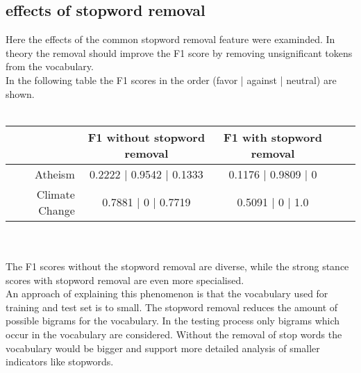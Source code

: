 \documentclass[a4paper,12pt,twoside]{article}
\begin{document}
\subsection{effects of stopword removal}
Here the effects of the common stopword removal feature were examinded. In theory the removal should improve the F1 score by removing unsignificant tokens from the vocabulary.\\
In the following table the F1 scores in the order (favor | against | neutral) are shown.\\
\\
\begin{tabular}{r|cccc}
& F1 without stopword removal &  F1 with stopword removal\\ \hline
Atheism & 0.2222 | 0.9542 | 0.1333 & 0.1176 | 0.9809 | 0\\
Climate Change & 0.7881 | 0 | 0.7719 & 0.5091 | 0 | 1.0 \\
\end{tabular}\\
\\
The F1 scores without the stopword removal are diverse, while the strong stance scores with stopword removal are even more specialised.\\
An approach of explaining this phenomenon is that the vocabulary used for training and test set is to small.
The stopword removal reduces the amount of possible bigrams for the vocabulary.
In the testing process only bigrams which occur in the vocabulary are considered.
Without the removal of stop words the vocabulary would be bigger and support more detailed analysis of smaller indicators like stopwords.
\\
\end{document}
